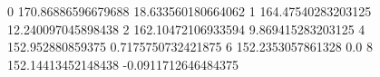 0 170.86886596679688 18.633560180664062
1 164.47540283203125 12.240097045898438
2 162.10472106933594 9.869415283203125
4 152.952880859375 0.7175750732421875
6 152.2353057861328 0.0
8 152.14413452148438 -0.0911712646484375
